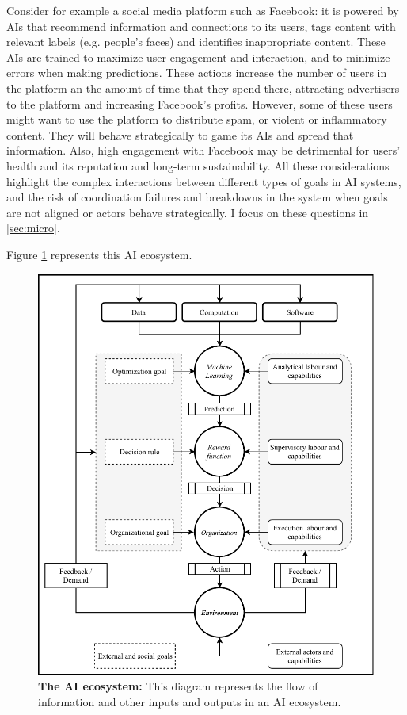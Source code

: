 \documentclass[11pt]{article}
\begin{document}
Consider for example a social media platform such as Facebook: it is powered by AIs that recommend information and connections to its users, tags content with relevant labels (e.g. people's faces) and identifies inappropriate content. These AIs are trained to maximize user engagement and interaction, and to minimize errors when making predictions. These actions increase the number of users in the platform an the amount of time that they spend there, attracting advertisers to the platform and increasing Facebook's profits. However, some of these users might want to use the platform to distribute spam, or violent or inflammatory content. They will behave strategically to game its AIs and spread that information. Also, high engagement with Facebook may be detrimental for users' health and its reputation and long-term sustainability. All these considerations highlight the complex interactions between different types of goals in AI systems, and the risk of coordination failures and breakdowns in the system when goals are not aligned or actors behave strategically. I focus on these questions in \ref{sec:micro}.

Figure \ref{fig:ecosystem} represents this AI ecosystem.

\begin{figure}
    \centering
    \includegraphics{ai_diagram.pdf}
    \caption{\textbf{The AI ecosystem:} This diagram represents the flow of information and other inputs and outputs in an AI ecosystem.}
    \label{fig:ecosystem}
\end{figure}
\end{document}
